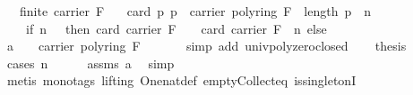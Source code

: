 \begin{isabellebody}
\ \ \ {\isachardoublequoteopen}finite\ {\isacharparenleft}{\kern0pt}carrier\ F{\isacharparenright}{\kern0pt}{\isachardoublequoteclose}\isanewline
\ \ \ {\isachardoublequoteopen}card\ {\isacharparenleft}{\kern0pt}{\isacharbraceleft}{\kern0pt}p{\isachardot}{\kern0pt}\ p\ {\isasymin}\ carrier\ {\isacharparenleft}{\kern0pt}poly{\isacharunderscore}{\kern0pt}ring\ F{\isacharparenright}{\kern0pt}\ {\isasymand}\ length\ p\ {\isacharequal}{\kern0pt}\ n{\isacharbraceright}{\kern0pt}{\isacharparenright}{\kern0pt}\ {\isacharequal}{\kern0pt}\ \isanewline
\ \ \ \ {\isacharparenleft}{\kern0pt}if\ n\ {\isasymge}\ {}\ then\ {\isacharparenleft}{\kern0pt}card\ {\isacharparenleft}{\kern0pt}carrier\ F{\isacharparenright}{\kern0pt}\ {\isacharminus}{\kern0pt}\ {}{\isacharparenright}{\kern0pt}\ {\isacharasterisk}{\kern0pt}\ {\isacharparenleft}{\kern0pt}card\ {\isacharparenleft}{\kern0pt}carrier\ F{\isacharparenright}{\kern0pt}\ {\isacharcircum}{\kern0pt}\ {\isacharparenleft}{\kern0pt}n{\isacharminus}{\kern0pt}{}{\isacharparenright}{\kern0pt}{\isacharparenright}{\kern0pt}\ else\ {}{\isacharparenright}{\kern0pt}{\isachardoublequoteclose}\isanewline
%
\isadelimproof
%
\endisadelimproof
%
\isatagproof
{}\isamarkupfalse%
\ {\isacharminus}{\kern0pt}\isanewline
\ \ \isamarkupfalse%
\ a{\isacharcolon}{\kern0pt}\ {\isachardoublequoteopen}\ {\isacharbrackleft}{\kern0pt}{\isacharbrackright}{\kern0pt}\ {\isasymin}\ carrier\ {\isacharparenleft}{\kern0pt}poly{\isacharunderscore}{\kern0pt}ring\ F{\isacharparenright}{\kern0pt}{\isachardoublequoteclose}\ \isanewline
\ \ \ \ \isamarkupfalse%
\ {\isacharparenleft}{\kern0pt}simp\ add{\isacharcolon}{\kern0pt}\ univ{\isacharunderscore}{\kern0pt}poly{\isacharunderscore}{\kern0pt}zero{\isacharunderscore}{\kern0pt}closed{\isacharparenright}{\kern0pt}\isanewline
\ \ \isamarkupfalse%
\ {\isacharquery}{\kern0pt}thesis\ \isanewline
\ \ \ \ \isamarkupfalse%
\ {\isacharparenleft}{\kern0pt}cases\ {\isachardoublequoteopen}n{\isachardoublequoteclose}{\isacharparenright}{\kern0pt}\isanewline
\ \ \ \ \isamarkupfalse%
\ assms\ a\ \isamarkupfalse%
\ {\isacharparenleft}{\kern0pt}simp{\isacharparenright}{\kern0pt}\ \isanewline
\ \ \ \ \ \isamarkupfalse%
\ {\isacharparenleft}{\kern0pt}metis\ {\isacharparenleft}{\kern0pt}mono{\isacharunderscore}{\kern0pt}tags{\isacharcomma}{\kern0pt}\ lifting{\isacharparenright}{\kern0pt}\ One{\isacharunderscore}{\kern0pt}nat{\isacharunderscore}{\kern0pt}def\ empty{\isacharunderscore}{\kern0pt}Collect{\isacharunderscore}{\kern0pt}eq\ is{\isacharunderscore}{\kern0pt}singletonI{\isacharprime}{\kern0pt}\ \isanewline

\end{isabellebody}

